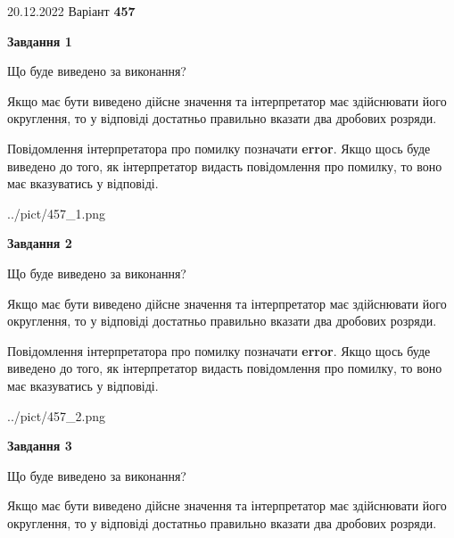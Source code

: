 \documentclass[12pt, ukrainian]{article}
\begin{document}
{20.12.2022 Варіант \No \textbf { 457 }\par}
{
\begin {Large}

{\begin {center}\textbf{Завдання 1}\end {center}}\par
Що буде виведено за виконання? \par

Якщо має бути виведено дійсне значення та інтерпретатор має здійснювати його округлення, 
то у відповіді достатньо правильно вказати два дробових розряди.

Повідомлення інтерпретатора про помилку позначати \textbf{error}.
Якщо щось буде виведено до того, як інтерпретатор видасть повідомлення про помилку, 
то воно має вказуватись у відповіді. \par

\begin{center}
	{../pict/457_1.png}
\end{center}
\newpage

{\begin {center}\textbf{Завдання 2}\end {center}}\par
Що буде виведено за виконання? \par

Якщо має бути виведено дійсне значення та інтерпретатор має здійснювати його округлення, 
то у відповіді достатньо правильно вказати два дробових розряди.

Повідомлення інтерпретатора про помилку позначати \textbf{error}.
Якщо щось буде виведено до того, як інтерпретатор видасть повідомлення про помилку, 
то воно має вказуватись у відповіді. \par

\begin{center}
	{../pict/457_2.png}
\end{center}
\newpage

{\begin {center}\textbf{Завдання 3}\end {center}}\par
Що буде виведено за виконання? \par

Якщо має бути виведено дійсне значення та інтерпретатор має здійснювати його округлення, 
то у відповіді достатньо правильно вказати два дробових розряди.


\end{Large}}
\end{document}
